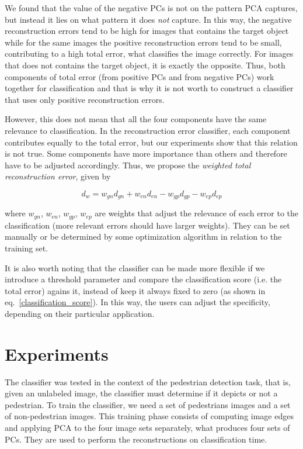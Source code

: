 \documentclass[10pt, conference, compsocconf]{IEEEtran}
\begin{document}
We found that the value of the negative PCs is not on the pattern PCA captures, but instead it lies on what pattern it does \emph{not} capture. In this way, the negative reconstruction errors tend to be high for images that contains the target object while for the same images the positive reconstruction errors tend to be small, contributing to a high total error, what classifies the image correctly. For images that does not contains the target object, it is exactly the opposite. Thus, both components of total error (from positive PCs and from negative PCs) work together for classification and that is why it is not worth to construct a classifier that uses only positive reconstruction errors.

However, this does not mean that all the four components have the same relevance to classification. In the reconstruction error classifier, each component contributes equally to the total error, but our experiments show that this relation is not true. Some components have more importance than others and therefore have to be adjusted accordingly. Thus, we propose the \emph{weighted total reconstruction error}, given by

\begin{equation}
  d_w = w_{gn} d_{gn} + w_{en} d_{en} - w_{gp} d_{gp} - w_{ep} d_{ep}
  \label{weighted_total_error}
\end{equation}

\noindent where $w_{gn}$, $w_{en}$, $w_{gp}$, $w_{ep}$ are weights that adjust the relevance of each error to the classification (more relevant errors should have larger weights). They can be set manually or be determined by some optimization algorithm in relation to the training set.

It is also worth noting that the classifier can be made more flexible if we introduce a threshold parameter and compare the classification score (i.e. the total error) agains it, instead of keep it always fixed to zero (as shown in eq.~\ref{classification_score}). In this way, the users can adjust the specificity, depending on their particular application.


\section{Experiments}

The classifier was tested in the context of the pedestrian detection task, that is, given an unlabeled image, the classifier must determine if it depicts or not a pedestrian. To train the classifier, we need a set of pedestrians images and a set of non-pedestrian images. This training phase consists of computing image edges and applying PCA to the four image sets separately, what produces four sets of PCs. They are used to perform the reconstructions on classification time.
\end{document}
